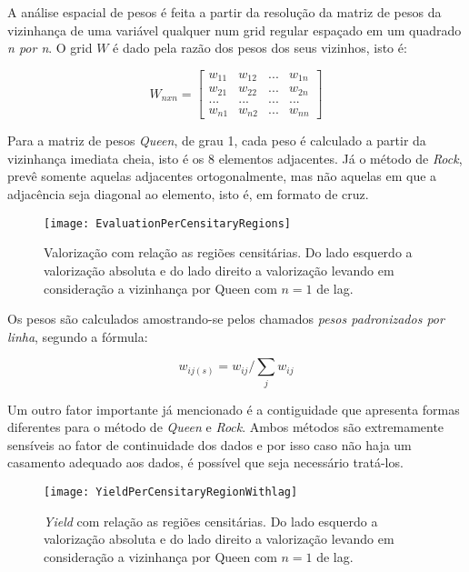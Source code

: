 A análise espacial de pesos é feita a partir da resolução da matriz de pesos da vizinhança de uma variável qualquer num grid regular espaçado em um quadrado \emph{n por n}. O grid $W$ é dado pela razão dos pesos dos seus vizinhos, isto é:

\[
W_{nxn}=\left[\begin{array}{cccc}
w_{11} & w_{12} & ... & w_{1n}\\
w_{21} & w_{22} & ... & w_{2n}\\
... & ... & ... &...\\
w_{n1} & w_{n2} & ... & w_{nn}
\end{array}\right]
\]

Para a matriz de pesos \emph{Queen}, de grau 1, cada peso é calculado a partir da vizinhança imediata cheia, isto é os 8 elementos adjacentes. Já o método de \emph{Rock}, prevê somente aquelas adjacentes ortogonalmente, mas não aquelas em que a adjacência seja diagonal ao elemento, isto é, em formato de cruz.

\begin{center}
\begin{figure}
\begin{centering}
\texttt{[image: EvaluationPerCensitaryRegions]}
\end{centering}
\caption{\label{fig:brazil_evaluation}Valorização com relação as regiões censitárias. Do lado esquerdo a valorização absoluta e do lado direito a valorização levando em consideração a vizinhança por Queen com $n=1$ de lag.}
\end{figure}
\vspace*{-44pt}
\end{center}

Os pesos são calculados amostrando-se pelos chamados \emph{pesos padronizados por linha}, segundo a fórmula:

\[
w_{ij(s)}=w_{ij}/\sum_{j}w_{ij}
\]

Um outro fator importante já mencionado é a contiguidade que apresenta formas diferentes para o método de \emph{Queen} e \emph{Rock}. Ambos métodos são extremamente sensíveis ao fator de continuidade dos dados e por isso caso não haja um casamento adequado aos dados, é possível que seja necessário tratá-los.

\begin{center}
\begin{figure}
\begin{centering}
\texttt{[image: YieldPerCensitaryRegionWithlag]}
\end{centering}
\caption{\label{fig:brazil_yields}\emph{Yield} com relação as regiões censitárias. Do lado esquerdo a valorização absoluta e do lado direito a valorização levando em consideração a vizinhança por Queen com $n=1$ de lag.}
\end{figure}
\vspace*{-44pt}
\end{center}

